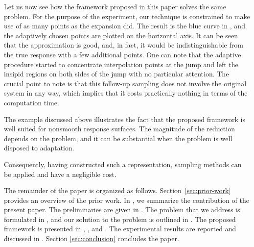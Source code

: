 Let us now see how the framework proposed in this paper solves the same problem.
For the purpose of the experiment, our technique is constrained to make use of
as many points as the  expansion did. The result is the blue curve in
, and the adaptively chosen points are plotted on the
horizontal axis. It can be seen that the approximation is good, and, in fact, it
would be indistinguishable from the true response with a few additional points.
One can note that the adaptive procedure started to concentrate interpolation
points at the jump and left the insipid regions on both sides of the jump with
no particular attention.  The crucial point to note is that this follow-up sampling
does not involve the original system in any way, which implies that it costs
practically nothing in terms of the computation time.

The example discussed above illustrates the fact that the proposed framework is
well suited for nonsmooth response surfaces.  The magnitude of the reduction depends on the
problem, and it can be substantial when the problem is well disposed to
adaptation.

Consequently, having constructed such a representation, sampling methods can be
applied and have a negligible cost.

The remainder of the paper is organized as follows. Section~\ref{sec:prior-work}
provides an overview of the prior work. In , we summarize the
contribution of the present paper. The preliminaries are given in
. The problem that we address is formulated in
, and our solution to the problem is outlined in .
The proposed framework is presented in , ,
and . The experimental results are reported and discussed in
. Section \ref{sec:conclusion} concludes the paper.
